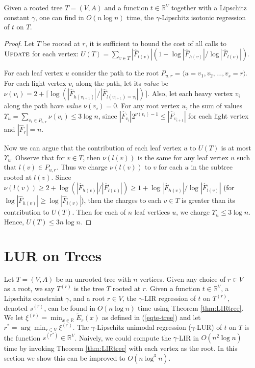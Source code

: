\documentclass[11pt]{article}
\def\Update{\mathop{\textsc{Update}}}
\newcommand{\hF}{\hat{F}}
\renewcommand{\b}[1]{\ensuremath{\mathbb{#1}}}
\begin{document}
\begin{theorem}\label{thm:LIRtree}
Given a rooted tree $T = (V, A)$ and a function $t \in \mathbb{R}^V$ together with a Lipschitz constant $\gamma$, one can find in $O(n \log n)$ time, the $\gamma$-Lipschitz isotonic regression of $t$ on $T$.
\end{theorem}
\begin{proof}
Let $T$ be rooted at $r$, it is sufficient to bound the cost of all calls to $\Update$ for each vertex: $U(T) = \sum_{v \in T} |\hF_{l(v)}| (1 + \log |\hF_{h(v)}| / \log |\hF_{l(v)}|)$.  

For each leaf vertex $u$ consider the path to the root $P_{u,r} = \langle u = v_1, v_2, \ldots, v_s = r\rangle$.  For each light vertex $v_i$ along the path, let its \emph{value} be $\nu(v_i) = 2+ \lceil \log(|\hF_{h(v_{i+1})}| / |\hF_{l(v_{i+1}) = v_i}|) \rceil$.  Also, let each heavy vertex $v_i$ along the path have \emph{value} $\nu(v_i) = 0$.  
For any root vertex $u$, the sum of values $\Upsilon_u = \sum_{v_i \in P_{u,r}} \nu(v_i)  \leq 3 \log n $, since $|\hF_{v_i}| 2^{\nu(v_i)-1} \leq |\hF_{v_{i+1}}|$ for each light vertex and $|\hF_r| = n$.  

Now we can argue that the contribution of each leaf vertex $u$ to $U(T)$ is at most $\Upsilon_u$.  Observe that for $v \in T$, then $\nu(l(v))$ is the same for any leaf vertex $u$ such that $l(v) \in P_{u,r}$.  Thus we charge $\nu(l(v))$ to $v$ for each $u$ in the subtree rooted at $l(v)$.  Since $\nu(l(v)) \geq 2 + \log(|\hF_{h(v)}|/|\hF_{l(v)}|) \geq 1 + \log |\hF_{h(v)}| / \log |\hF_{l(v)}|$ (for $\log |\hF_{h(v)}| \geq \log |\hF_{l(v)}|$), then the charges to each $v \in T$ is greater than its contribution to $U(T)$.  Then for each of $n$ leaf vertices $u$, we charge $\Upsilon_u \leq 3 \log n$.  Hence, $U(T) \leq 3 n \log n$.  
\end{proof}



\section{LUR on Trees}
\label{sec:treelur}

Let $T = (V,A)$ be an unrooted tree with $n$ vertices.  
Given any choice of $r \in V$ as a root, we say $T^{(r)}$ is the tree $T$ rooted at $r$.  
Given a function $t \in \b{R}^V$, a Lipschitz constraint $\gamma$, and a root $r \in V$, the $\gamma$-LIR regression of $t$ on $T^{(r)}$, denoted $s^{(r)}$, can be found in $O(n \log n)$ time using Theorem \ref{thm:LIRtree}.  We let $\xi^{(r)} = \min_{x \in \b{R}} \tilde{E}_r(x)$ as defined in (\ref{eqte-tree}) and let $r^* = \arg \min_{r \in V} \xi^{(r)}$.  The $\gamma$-Lipschitz unimodal regression ($\gamma$-LUR) of $t$ on $T$ is the function $s^{(r^*)} \in \b{R}^V$.  
Naively, we could compute the $\gamma$-LIR in $O(n^2 \log n)$ time by invoking Theorem \ref{thm:LIRtree} with each vertex as the root. In this section we show this can be improved to $O(n \log^3 n)$.
\end{document}
